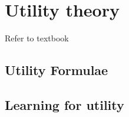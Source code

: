 \section{Utility theory}
Refer to textbook \cite{aima}

\subsection{Utility Formulae}


\subsection{Learning for utility}

